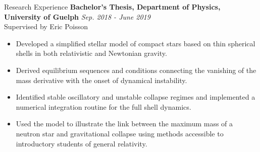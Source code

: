 \documentclass{resume} %
\begin{document}
\begin{rSection}{Research Experience}
{\bf Bachelor's Thesis, Department of Physics, University of Guelph} \hfill{\textit{Sep. 2018 - June 2019}}\\
Supervised by Eric Poisson
\begin{itemize}
\item Developed a simplified stellar model of compact stars based on thin spherical shells in both relativistic and Newtonian gravity.
\item Derived equilibrium sequences and conditions connecting the vanishing of the mass derivative with the onset of dynamical instability.
\item Identified stable oscillatory and unstable collapse regimes and implemented a numerical integration routine for the full shell dynamics.
\item Used the model to illustrate the link between the maximum mass of a neutron star and gravitational collapse using methods accessible to introductory students of general relativity.
\end{itemize}

\end{rSection}

\vspace{1em}
\end{document}
